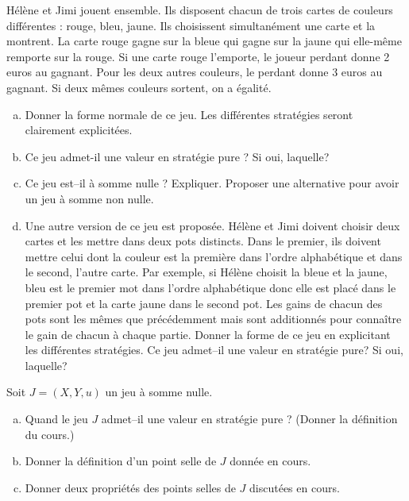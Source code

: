 \documentclass[french,11pt,leqno]{article}
\newcounter{exocount}
\newcounter{questcount}
\def\exo{\bigskip\noindent{\bf Exercice \theexocount {} -}
  \addtocounter{exocount}{1} \setcounter{questcount}{1}}
\begin{document}
\exo
H\'el\`ene et Jimi jouent ensemble. Ils disposent chacun de trois cartes de couleurs diff\'erentes : rouge, bleu, jaune. 
Ils choisissent simultan\'ement une carte et la montrent. 
La carte rouge gagne sur la bleue qui gagne sur la jaune qui elle-m\^eme remporte sur la rouge. 
Si une carte rouge l'emporte, le joueur perdant donne 2 euros au gagnant. 
Pour les deux autres couleurs, le perdant donne 3 euros au gagnant. Si deux m\^emes couleurs sortent, on a \'egalit\'e.
\begin{enumerate}[a)]%
\item Donner la forme normale de ce jeu. Les diff\'erentes strat\'egies seront clairement explicit\'ees.
\item Ce jeu admet-il une valeur en strat\'egie pure ? Si oui, laquelle?
\item Ce jeu est--il \`a somme nulle ? Expliquer. Proposer une alternative pour avoir un jeu \`a somme non nulle.
\item Une autre version de ce jeu est propos\'ee. H\'el\`ene et Jimi doivent choisir deux cartes et les mettre dans deux pots distincts. 
     Dans le premier, ils doivent mettre celui dont la couleur est la premi\`ere dans l'ordre alphab\'etique et dans le second, l'autre carte. 
   Par exemple, si H\'el\`ene choisit la bleue et la jaune, bleu est le premier mot dans l'ordre alphab\'etique donc elle est plac\'e dans le premier pot et la 
  carte jaune dans le second pot. 
   Les gains de chacun des pots sont les m\^emes que pr\'ec\'edemment mais sont additionn\'es pour conna\^itre le gain de chacun \`a chaque partie. 
  Donner la forme de ce jeu en explicitant les diff\'erentes strat\'egies. Ce jeu admet--il une valeur en strat\'egie pure? Si oui, laquelle?
\end{enumerate}


\exo
Soit $J=(X,Y,u)$ un jeu \`a somme nulle. 
 \begin{enumerate}[a)]
  \item Quand le jeu $J$ admet--il une valeur en strat\'egie pure ? (Donner la d\'efinition du cours.)
  \item 
Donner la d\'efinition d'un point selle de $J$ donn\'ee en cours.
  \item Donner deux propri\'et\'es des points selles de $J$ discut\'ees en cours.
\end{enumerate}
\medskip
\medskip
\end{document}
